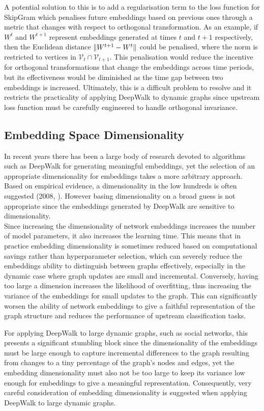 \documentclass[a4paper]{article}
\renewcommand{\V}{\mathcal V}
\begin{document}
A potential solution to this is to add a regularisation term to the loss function for SkipGram which penalises future embeddings based on previous ones through a metric that changes with respect to orthogonal
transformation. As an example, if $W^t$ and $W^{t+1}$ represent embeddings generated at times $t$ and $t+1$ respectively, then the Euclidean distance $\lVert W^{t+1} - W^t\rVert$ could be penalised,
where the norm is restricted to vertices in $\V_t \cap \V_{t+1}$. This penalisation would reduce the incentive for orthogonal transformations that change the embeddings across time periods, but its
effectiveness would be diminished as the time gap between two embeddings is increased. Ultimately, this is a difficult problem to resolve and it restricts the practicality of applying DeepWalk to dynamic graphs since upstream loss function must be carefully engineered to handle orthogonal invariance.
\subsection{Embedding Space Dimensionality}
In recent years there has been a large body of research devoted to algorithms such as DeepWalk for generating meaningful embeddings, yet the selection of an appropriate dimensionality for embeddings
takes a more arbitrary approach. Based on empirical evidence, a dimensionality in the low hundreds is often suggested (2008, \cite{bradford2008}). However basing dimensionality on a broad guess is not appropriate since the embeddings generated by DeepWalk are sensitive to dimensionality.\\
Since increasing the dimensionality of network embeddings increases the number of model parameters, it also increases the learning time. This means that
in practice embedding dimensionality is sometimes reduced based on computational savings rather than hyperparameter selection, which can severely reduce the embeddings ability to
distinguish between graphs effectively, especially in the dynamic case where graph updates are small and incremental.
Conversely, having too large a dimension increases the likelihood of overfitting, thus increasing the variance of the embeddings for small updates to the graph. This can significantly
worsen the ability of network embeddings to give a faithful representation of the graph structure and reduces the performance of upstream classification
tasks.

For applying DeepWalk to large dynamic graphs, such as social networks, this presents a significant stumbling block since the dimensionality of the embeddings must be large enough to capture incremental differences
to the graph resulting from changes to a tiny percentage of the graph's nodes and edges, yet the embedding dimensionality must also not be too large to keep its variance low enough for embeddings to
give a meaningful representation. Consequently, very careful consideration of embedding dimensionality is suggested when applying DeepWalk to large dynamic graphs.
\end{document}
